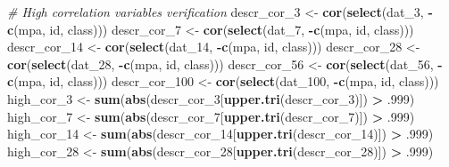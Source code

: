 \documentclass[
]{article}
\newenvironment{Shaded}{\begin{snugshade}}{\end{snugshade}}
\newcommand{\CommentTok}[1]{\textcolor[rgb]{0.56,0.35,0.01}{\textit{#1}}}
\newcommand{\DecValTok}[1]{\textcolor[rgb]{0.00,0.00,0.81}{#1}}
\newcommand{\FloatTok}[1]{\textcolor[rgb]{0.00,0.00,0.81}{#1}}
\newcommand{\KeywordTok}[1]{\textcolor[rgb]{0.13,0.29,0.53}{\textbf{#1}}}
\newcommand{\NormalTok}[1]{#1}
\newcommand{\OperatorTok}[1]{\textcolor[rgb]{0.81,0.36,0.00}{\textbf{#1}}}
\newcommand{\StringTok}[1]{\textcolor[rgb]{0.31,0.60,0.02}{#1}}
\begin{document}
\label{show-cors}

\begin{Shaded}
\begin{Highlighting}[]
\CommentTok{# High correlation variables verification}
\NormalTok{descr_cor_}\DecValTok{3}\NormalTok{ <-}\StringTok{ }\KeywordTok{cor}\NormalTok{(}\KeywordTok{select}\NormalTok{(dat_}\DecValTok{3}\NormalTok{, }\OperatorTok{-}\KeywordTok{c}\NormalTok{(mpa, id, class)))}
\NormalTok{descr_cor_}\DecValTok{7}\NormalTok{ <-}\StringTok{ }\KeywordTok{cor}\NormalTok{(}\KeywordTok{select}\NormalTok{(dat_}\DecValTok{7}\NormalTok{, }\OperatorTok{-}\KeywordTok{c}\NormalTok{(mpa, id, class)))}
\NormalTok{descr_cor_}\DecValTok{14}\NormalTok{ <-}\StringTok{ }\KeywordTok{cor}\NormalTok{(}\KeywordTok{select}\NormalTok{(dat_}\DecValTok{14}\NormalTok{, }\OperatorTok{-}\KeywordTok{c}\NormalTok{(mpa, id, class)))}
\NormalTok{descr_cor_}\DecValTok{28}\NormalTok{ <-}\StringTok{ }\KeywordTok{cor}\NormalTok{(}\KeywordTok{select}\NormalTok{(dat_}\DecValTok{28}\NormalTok{, }\OperatorTok{-}\KeywordTok{c}\NormalTok{(mpa, id, class)))}
\NormalTok{descr_cor_}\DecValTok{56}\NormalTok{ <-}\StringTok{ }\KeywordTok{cor}\NormalTok{(}\KeywordTok{select}\NormalTok{(dat_}\DecValTok{56}\NormalTok{, }\OperatorTok{-}\KeywordTok{c}\NormalTok{(mpa, id, class)))}
\NormalTok{descr_cor_}\DecValTok{100}\NormalTok{ <-}\StringTok{ }\KeywordTok{cor}\NormalTok{(}\KeywordTok{select}\NormalTok{(dat_}\DecValTok{100}\NormalTok{, }\OperatorTok{-}\KeywordTok{c}\NormalTok{(mpa, id, class)))}
\NormalTok{high_cor_}\DecValTok{3}\NormalTok{ <-}\StringTok{ }\KeywordTok{sum}\NormalTok{(}\KeywordTok{abs}\NormalTok{(descr_cor_}\DecValTok{3}\NormalTok{[}\KeywordTok{upper.tri}\NormalTok{(descr_cor_}\DecValTok{3}\NormalTok{)]) }\OperatorTok{>}\StringTok{ }\FloatTok{.999}\NormalTok{)}
\NormalTok{high_cor_}\DecValTok{7}\NormalTok{ <-}\StringTok{ }\KeywordTok{sum}\NormalTok{(}\KeywordTok{abs}\NormalTok{(descr_cor_}\DecValTok{7}\NormalTok{[}\KeywordTok{upper.tri}\NormalTok{(descr_cor_}\DecValTok{7}\NormalTok{)]) }\OperatorTok{>}\StringTok{ }\FloatTok{.999}\NormalTok{)}
\NormalTok{high_cor_}\DecValTok{14}\NormalTok{ <-}\StringTok{ }\KeywordTok{sum}\NormalTok{(}\KeywordTok{abs}\NormalTok{(descr_cor_}\DecValTok{14}\NormalTok{[}\KeywordTok{upper.tri}\NormalTok{(descr_cor_}\DecValTok{14}\NormalTok{)]) }\OperatorTok{>}\StringTok{ }\FloatTok{.999}\NormalTok{)}
\NormalTok{high_cor_}\DecValTok{28}\NormalTok{ <-}\StringTok{ }\KeywordTok{sum}\NormalTok{(}\KeywordTok{abs}\NormalTok{(descr_cor_}\DecValTok{28}\NormalTok{[}\KeywordTok{upper.tri}\NormalTok{(descr_cor_}\DecValTok{28}\NormalTok{)]) }\OperatorTok{>}\StringTok{ }\FloatTok{.999}\NormalTok{)}

\end{Highlighting}
\end{Shaded}
\end{document}
